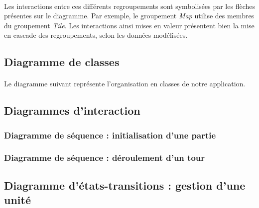 \documentclass[a4paper]{article}
\begin{document}
\paragraph{}
Les interactions entre ces différents regroupements sont symbolisées par les flèches présentes sur le diagramme. Par exemple, le groupement \textit{Map} utilise des membres du groupement \textit{Tile}. Les interactions ainsi mises en valeur présentent bien la mise en cascade des regroupements, selon les données modélisées.



\subsection{Diagramme de classes}
\label{DDC}
\paragraph{}
Le diagramme suivant représente l'organisation en classes de notre application.



\subsection{Diagrammes d'interaction}

\subsubsection{Diagramme de séquence : initialisation d'une partie}

\subsubsection{Diagramme de séquence : déroulement d'un tour}

\subsection{Diagramme d'états-transitions : gestion d'une unité}


\end{document}
